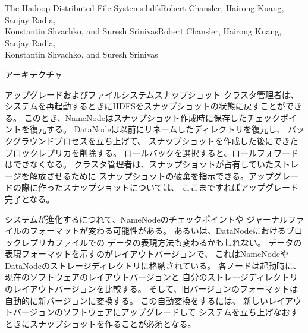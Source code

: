 \begin{aosachaptertoc}{The Hadoop Distributed File System}{s:hdfs}{Robert Chansler, Hairong Kuang, Sanjay Radia, \\ Konstantin Shvachko, and Suresh Srinivas}{Robert Chansler, Hairong Kuang, Sanjay Radia, \\ \hspace*{0.9cm} Konstantin Shvachko, and Suresh Srinivas}
\begin{aosasect1}{アーキテクチャ}
\begin{aosasect2}{アップグレードおよびファイルシステムスナップショット}
クラスタ管理者は、システムを再起動するときにHDFSをスナップショットの状態に戻すことができる。
このとき、NameNodeはスナップショット作成時に保存したチェックポイントを復元する。
DataNodeは以前にリネームしたディレクトリを復元し、
バックグラウンドプロセスを立ち上げて、
スナップショットを作成した後にできたブロックレプリカを削除する。
ロールバックを選択すると、ロールフォワードはできなくなる。
クラスタ管理者は、スナップショットが占有していたストレージを解放させるために
スナップショットの破棄を指示できる。アップグレードの際に作ったスナップショットについては、
ここまですればアップグレード完了となる。

システムが進化するにつれて、NameNodeのチェックポイントや
ジャーナルファイルのフォーマットが変わる可能性がある。
あるいは、DataNodeにおけるブロックレプリカファイルでの
データの表現方法も変わるかもしれない。
データの表現フォーマットを示すのがレイアウトバージョンで、
これはNameNodeやDataNodeのストレージディレクトリに格納されている。
各ノードは起動時に、現在のソフトウェアのレイアウトバージョンと
自分のストレージディレクトリのレイアウトバージョンを比較する。
そして、旧バージョンのフォーマットは自動的に新バージョンに変換する。
この自動変換をするには、
新しいレイアウトバージョンのソフトウェアにアップグレードして
システムを立ち上げなおすときにスナップショットを作ることが必須となる。


\end{aosasect2}
\end{aosasect1}
\end{aosachaptertoc}
